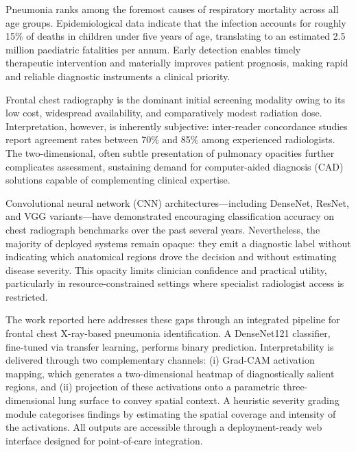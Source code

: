 \documentclass[conference]{IEEEtran}
\begin{document}
\noindent\hspace{0.5cm}Pneumonia ranks among the foremost causes of respiratory mortality across all age groups. Epidemiological data indicate that the infection accounts for roughly 15\% of deaths in children under five years of age, translating to an estimated 2.5 million paediatric fatalities per annum. Early detection enables timely therapeutic intervention and materially improves patient prognosis, making rapid and reliable diagnostic instruments a clinical priority.

Frontal chest radiography is the dominant initial screening modality owing to its low cost, widespread availability, and comparatively modest radiation dose. Interpretation, however, is inherently subjective: inter-reader concordance studies report agreement rates between 70\% and 85\% among experienced radiologists. The two-dimensional, often subtle presentation of pulmonary opacities further complicates assessment, sustaining demand for computer-aided diagnosis (CAD) solutions capable of complementing clinical expertise.

Convolutional neural network (CNN) architectures---including DenseNet, ResNet, and VGG variants---have demonstrated encouraging classification accuracy on chest radiograph benchmarks over the past several years. Nevertheless, the majority of deployed systems remain opaque: they emit a diagnostic label without indicating which anatomical regions drove the decision and without estimating disease severity. This opacity limits clinician confidence and practical utility, particularly in resource-constrained settings where specialist radiologist access is restricted.

The work reported here addresses these gaps through an integrated pipeline for frontal chest X-ray-based pneumonia identification. A DenseNet121 classifier, fine-tuned via transfer learning, performs binary prediction. Interpretability is delivered through two complementary channels: (i) Grad-CAM activation mapping, which generates a two-dimensional heatmap of diagnostically salient regions, and (ii) projection of these activations onto a parametric three-dimensional lung surface to convey spatial context. A heuristic severity grading module categorises findings by estimating the spatial coverage and intensity of the activations. All outputs are accessible through a deployment-ready web interface designed for point-of-care integration.

\end{document}
